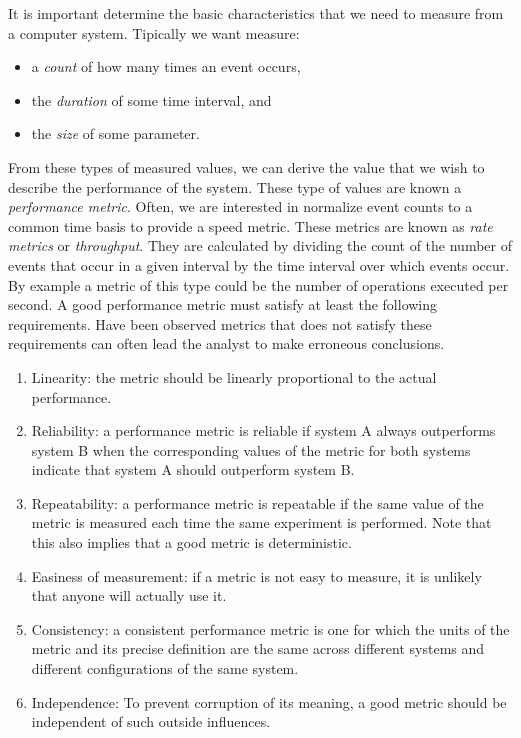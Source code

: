 \documentclass[openany, a4paper]{book}
\theoremstyle{break}
\theoremstyle{example}
\theoremstyle{note}
\theoremstyle{break}
\theoremstyle{exercise}
\begin{document}
It is important determine the basic characteristics that we need to measure
from a computer system. Tipically we want measure:

\begin{itemize}
\item a \emph{count} of how many times an event occurs,
\item the \emph{duration} of some time interval, and
\item the \emph{size} of some parameter.
\end{itemize}


From these types of measured values, we can derive the value that we wish to
describe the performance of the system. These type of values are known a
\emph{performance metric}. Often, we are interested in normalize event counts to a
common time basis to provide a speed metric. These metrics are known as \emph{rate
metrics} or \emph{throughput}. They are calculated by dividing the count of the
number of events that occur in a given interval by the time interval over
which events occur. By example a metric of this type could be the number of
operations executed per second. A good performance metric must satisfy at
least the following requirements. Have been observed metrics that does not
satisfy these requirements can often lead the analyst to make erroneous
conclusions.

\begin{enumerate}
\item Linearity: the metric should be linearly proportional to the actual
performance.
\item Reliability: a performance metric is reliable if system A always
outperforms system B when the corresponding values of the metric for both
systems indicate that system A should outperform system B.
\item Repeatability: a performance metric is repeatable if the same value of the
metric is measured each time the same experiment is performed. Note that
this also implies that a good metric is deterministic.
\item Easiness of measurement: if a metric is not easy to measure, it is
unlikely that anyone will actually use it.
\item Consistency: a consistent performance metric is one for which the units of
the metric and its precise definition are the same across different
systems and different configurations of the same system.
\item Independence: To prevent corruption of its meaning, a good metric should
be independent of such outside influences.
\end{enumerate}
\end{document}
